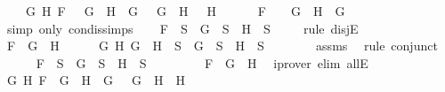 \begin{isabellebody}
\ \ \ \ {\isacharparenleft}{\isasymexists}G{}\ H{}{\isachardot}\ F\ {\isacharequal}\ \isactrlbold {\isasymnot}\ {\isacharparenleft}G{}\ \isactrlbold {\isasymand}\ H{}{\isacharparenright}\ {\isasymand}\ G\ {\isacharequal}\ \isactrlbold {\isasymnot}\ G{}\ {\isasymand}\ H\ {\isacharequal}\ \isactrlbold {\isasymnot}\ H{}{\isacharparenright}\ {\isasymor}\ \isanewline
\ \ \ \ F\ {\isacharequal}\ \isactrlbold {\isasymnot}\ {\isacharparenleft}\isactrlbold {\isasymnot}\ G{\isacharparenright}\ {\isasymand}\ H\ {\isacharequal}\ G{\isachardoublequoteclose}\ \isanewline
\ \ \ \ \isamarkupfalse%
\ {\isacharparenleft}simp\ only{\isacharcolon}\ con{\isacharunderscore}dis{\isacharunderscore}simps{\isacharparenleft}{}{\isacharparenright}{\isacharparenright}\isanewline
\ \ \isamarkupfalse%
\ {\isachardoublequoteopen}F\ {\isasymin}\ S\ {\isasymlongrightarrow}\ G\ {\isasymin}\ S\ {\isasymor}\ H\ {\isasymin}\ S{\isachardoublequoteclose}\ \isanewline
\ \ \isamarkupfalse%
\ {\isacharparenleft}rule\ disjE{\isacharparenright}\isanewline
\ \ \ \ \isamarkupfalse%
\ {\isachardoublequoteopen}F\ {\isacharequal}\ G\ \isactrlbold {\isasymor}\ H{\isachardoublequoteclose}\isanewline
\ \ \ \ \isamarkupfalse%
\ {\isachardoublequoteopen}{\isasymforall}G\ H{\isachardot}\ G\ \isactrlbold {\isasymor}\ H\ {\isasymin}\ S\ {\isasymlongrightarrow}\ G\ {\isasymin}\ S\ {\isasymor}\ H\ {\isasymin}\ S{\isachardoublequoteclose}\isanewline
\ \ \ \ \ \ \isamarkupfalse%
\ assms\ \isamarkupfalse%
\ {\isacharparenleft}rule\ conjunct{}{\isacharparenright}\isanewline
\ \ \ \ \isamarkupfalse%
\ {\isachardoublequoteopen}F\ {\isasymin}\ S\ {\isasymlongrightarrow}\ G\ {\isasymin}\ S\ {\isasymor}\ H\ {\isasymin}\ S{\isachardoublequoteclose}\ \isanewline
\ \ \ \ \ \ \isamarkupfalse%
\ {\isacartoucheopen}F\ {\isacharequal}\ G\ \isactrlbold {\isasymor}\ H{\isacartoucheclose}\ \isamarkupfalse%
\ {\isacharparenleft}iprover\ elim{\isacharcolon}\ allE{\isacharparenright}\isanewline
\ \ \isamarkupfalse%
\isanewline
\ \ \ \ \isamarkupfalse%
\ {\isachardoublequoteopen}{\isacharparenleft}{\isasymexists}G{}\ H{}{\isachardot}\ F\ {\isacharequal}\ G{}\ \isactrlbold {\isasymrightarrow}\ H{}\ {\isasymand}\ G\ {\isacharequal}\ \isactrlbold {\isasymnot}\ G{}\ {\isasymand}\ H\ {\isacharequal}\ H{}{\isacharparenright}\ {\isasymor}\ \isanewline

\end{isabellebody}

